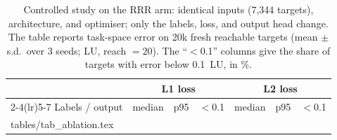 \documentclass[conference]{IEEEtran}
\makeatletter
\newcommand{\tabinput}[1]{\@@input #1 }
\makeatother
\begin{document}
\begin{table}[t]
\centering
\small
\setlength{\tabcolsep}{4pt}
\caption{Controlled study on the RRR arm: identical inputs (7{,}344 targets), architecture, and optimiser; only the labels, loss, and output head change. The table reports task-space error on 20k fresh reachable targets (mean $\pm$ s.d.\ over 3 seeds; LU, reach $=20$). The ``$<$0.1'' columns give the share of targets with error below 0.1~LU, in \%.}
\label{tab:ablation}
\begin{tabular}{lrrrrrr}
\toprule
 & \multicolumn{3}{c}{L1 loss} & \multicolumn{3}{c}{L2 loss} \\
\cmidrule(lr){2-4}\cmidrule(lr){5-7}
Labels / output & median & p95 & $<$0.1 & median & p95 & $<$0.1 \\
\midrule
\tabinput{tables/tab_ablation.tex}
\bottomrule
\end{tabular}
\end{table}
\end{document}

